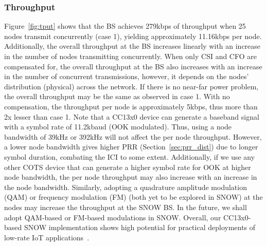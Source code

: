 \subsubsection{Throughput}
Figure~\ref{fig:tput} shows that the BS achieves 279kbps of throughput when 25 nodes transmit concurrently (case 1), yielding approximately 11.16kbps per node. Additionally, the overall throughput at the BS increases linearly with an increase in the number of nodes transmitting concurrently. When only CSI and CFO are compensated for, the overall throughput at the BS also increases with an increase in the number of concurrent transmissions, however, it depends on the nodes' distribution (physical) across the network. If there is no near-far power problem, the overall throughput may be the same as observed in case 1. With no compensation, the throughput per node is approximately 5kbps, thus more than 2x lesser than case 1. Note that a CC13x0 device can generate a baseband signal with a symbol rate of 11.2kbaud (OOK modulated). Thus, using a node bandwidth of 39kHz or 392kHz will not affect the per node throughput. However, a lower node bandwidth gives higher PRR (Section~\ref{sec:prr_dist}) due to longer symbol duration, combating the ICI to some extent.
Additionally, if we use any other COTS device that can generate a higher symbol rate for OOK at higher node bandwidth, the per node throughput may also increase with an increase in the node bandwidth. Similarly, adopting a quadrature amplitude modulation (QAM) or frequency modulation (FM) (both yet to be explored in SNOW) at the nodes may increase the throughput at the SNOW BS. In the future, we shall adopt QAM-based or FM-based modulations in SNOW.
Overall, our CC13x0-based SNOW implementation shows high potential for practical deployments of low-rate IoT applications~\cite{whitespaceSurvey, ismail2018low}.


